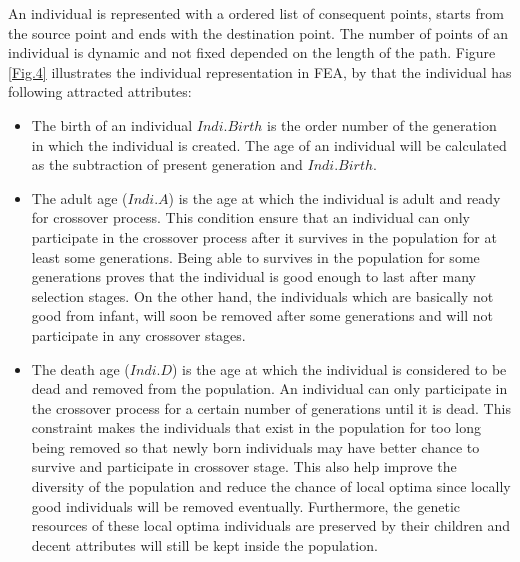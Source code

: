 \documentclass[final]{elsarticle}
\begin{document}
An individual is represented with a ordered list of consequent points, starts from the source point and ends with the destination point. The number of points of an individual is dynamic and not fixed depended on the length of the path. Figure \ref{Fig.4} illustrates the individual representation in FEA, by that the individual has following attracted attributes: \\
\begin{itemize}
	\item The birth of an individual $Indi.Birth$ is the order number of the generation in which the individual is created. The age of an individual will be calculated as the subtraction of present generation and $Indi.Birth$.
	\item The adult age ($Indi.A$) is the age at which the individual is adult and ready for crossover process. This condition ensure that an individual can only participate in the crossover process after it survives in the population for at least some generations. Being able to survives in the population for some generations proves that the individual is good enough to last after many selection stages. On the other hand, the individuals which are basically not good from infant, will soon be removed after some generations and will not participate in any crossover stages.
	\item The death age ($Indi.D$) is the age at which the individual is considered to be dead and removed from the population. An individual can only participate in the crossover process for a certain number of generations until it is dead. This constraint makes the individuals that exist in the population for too long being removed so that newly born individuals may have better chance to survive and participate in crossover stage. This also help improve the diversity of the population and reduce the chance of local optima since locally good individuals will be removed eventually. Furthermore, the genetic resources of these local optima individuals are preserved by their children and decent attributes will still be kept inside the population.
\end{itemize}
\end{document}
